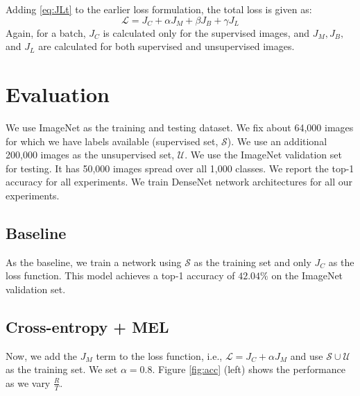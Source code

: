 \documentclass[runningheads]{llncs}
\begin{document}
Adding \eqref{eq:JLt} to the earlier loss formulation, the total loss is given as:
\begin{equation}
	\mathcal{L} = J_C + \alpha J_M + \beta J_B + \gamma J_L
\end{equation}
Again, for a batch, $J_C$ is calculated only for the supervised images, and $J_M, J_B, $ and $J_L$
are calculated for both supervised and unsupervised images.


\section{Evaluation}
We use ImageNet as the training and testing dataset. We fix about 64,000 images for which
we have labels available (supervised set, $\mathcal{S}$). We use an additional 200,000 images as the
unsupervised set, $\mathcal{U}$. We use the ImageNet validation set for testing. It has 50,000
images spread over all 1,000 classes. We report the top-1 accuracy for all experiments. We train
DenseNet network architectures for all our experiments.

\subsection{Baseline}
As the baseline, we train a network using $\mathcal{S}$ as the training set and only $J_C$ as the loss
function. This model achieves a top-1 accuracy of $42.04\%$ on the ImageNet validation set. 

\subsection{Cross-entropy + MEL}
Now, we add the $J_M$ term to the loss function, i.e., $\mathcal{L} = J_C + \alpha
J_M$ and use $\mathcal{S} \cup \mathcal{U}$ as the training set. We set $\alpha = 0.8$. Figure
\ref{fig:acc} (left) shows the performance as we vary $\frac{R}{T}$.
\end{document}
